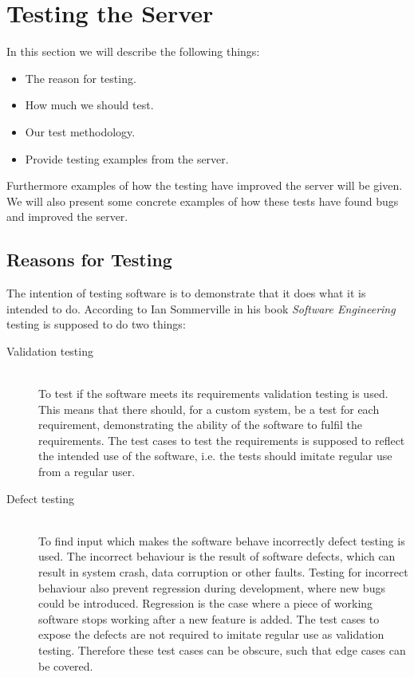 \section{Testing the Server}\label{sec:testing}
In this section we will describe the following things:
\begin{itemize}
    \item The reason for testing.
    \item How much we should test.
    \item Our test methodology.
    \item Provide testing examples from the server.
\end{itemize}

Furthermore examples of how the testing have improved the server will be given.
We will also present some concrete examples of how these tests have found bugs and improved the server.

\subsection{Reasons for Testing}
The intention of testing software is to demonstrate that it does what it is intended to do.
According to Ian Sommerville in his book \textit{Software Engineering}\cite[p.~227]{software_engineering} testing is supposed to do two things:

\begin{description}
    \item[Validation testing]\cite[p.~227]{software_engineering} \hfill\\
    To test if the software meets its requirements validation testing is used.
    This means that there should, for a custom system, be a test for each requirement, 
    demonstrating the ability of the software to fulfil the requirements.
    The test cases to test the requirements is supposed to reflect the intended use of the software,
    i.e. the tests should imitate regular use from a regular user.

    \item[Defect testing]\cite[p.~227]{software_engineering} \hfill\\
    To find input which makes the software behave incorrectly defect testing is used.
    The incorrect behaviour is the result of software defects, 
    which can result in system crash, data corruption or other faults.
    Testing for incorrect behaviour also prevent regression during development,
    where new bugs could be introduced.
    Regression is the case where a piece of working software stops working after a new feature is added\cite{regression}.
    The test cases to expose the defects are not required to imitate regular use as validation testing.
    Therefore these test cases can be obscure, such that edge cases can be covered.
\end{description}

